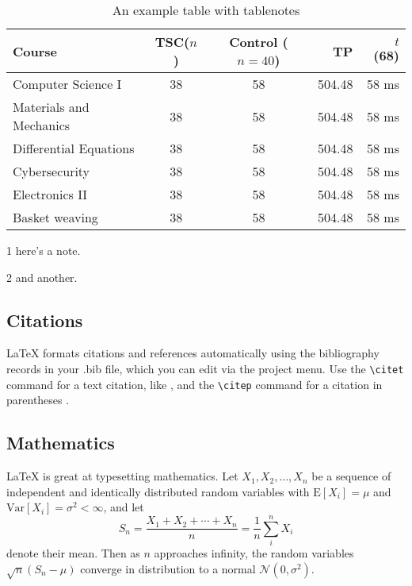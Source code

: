 \documentclass[11pt]{report}
\begin{document}
\begin{table}[hbt!]\centering
\begin{threeparttable}
\caption{An example table with tablenotes}\label{tab:withnotes}

\begin{tabular}{lccrr}
\toprule
Course & TSC($n$) & Control ($n=40$) & TP & $t$ (68)\\
\midrule
Computer Science I & 38 & 58\tnote{1} & 504.48 & 58 ms\\
Materials and Mechanics & 38 & 58 & 504.48 & 58 ms\\
Differential Equations & 38 & 58 & 504.48 & 58 ms\\
Cybersecurity & 38 & 58 & 504.48 & 58 ms\\
Electronics II\tnote{2} & 38 & 58 & 504.48 & 58 ms\\
Basket weaving & 38 & 58 & 504.48 & 58 ms\\
\bottomrule
\end{tabular}
\begin{tablenotes}
\item[1] here's a note.
\item[2] and another.
\end{tablenotes}
\end{threeparttable}
\end{table}

\subsection{Citations}

LaTeX formats citations and references automatically using the bibliography records in your .bib file, which you can edit via the project menu. Use the \verb|\citet| command for a text citation, like \citet{borowczak2019mitigating}, and the \verb|\citep| command for a citation in parentheses \citep{burrows2018integrated}.

\subsection{Mathematics}

\LaTeX{} is great at typesetting mathematics. Let $X_1, X_2, \ldots, X_n$ be a sequence of independent and identically distributed random variables with $\text{E}[X_i] = \mu$ and $\text{Var}[X_i] = \sigma^2 < \infty$, and let
\begin{equation}\label{eq:sum}
S_n = \frac{X_1 + X_2 + \cdots + X_n}{n}
      = \frac{1}{n}\sum_{i}^{n} X_i
\end{equation}
denote their mean. Then as $n$ approaches infinity, the random variables $\sqrt{n}(S_n - \mu)$ converge in distribution to a normal $\mathcal{N}(0, \sigma^2)$.
\end{document}
